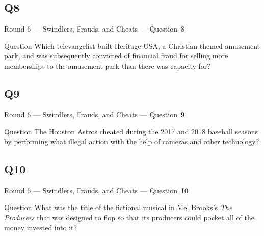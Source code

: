 \documentclass[11pt]{beamer}
\begin{document}
\subsection*{Q8}
\begin{frame}[t]{Round 6 --- Swindlers, Frauds, and Cheats --- \mbox{Question 8}}
\vspace{-0.5em}
\begin{block}{Question}
Which televangelist built Heritage USA, a Christian-themed amusement park, and was subsequently convicted of financial fraud for selling more memberships to the amusement park than there was capacity for?
\end{block}
\end{frame}
\subsection*{Q9}
\begin{frame}[t]{Round 6 --- Swindlers, Frauds, and Cheats --- \mbox{Question 9}}
\vspace{-0.5em}
\begin{block}{Question}
The Houston Astros cheated during the 2017 and 2018 baseball seasons by performing what illegal action with the help of cameras and other technology?
\end{block}
\end{frame}
\subsection*{Q10}
\begin{frame}[t]{Round 6 --- Swindlers, Frauds, and Cheats --- \mbox{Question 10}}
\vspace{-0.5em}
\begin{block}{Question}
What was the title of the fictional musical in Mel Brooks's \emph{The Producers} that was designed to flop so that its producers could pocket all of the money invested into it?
\end{block}
\end{frame}
\end{document}
